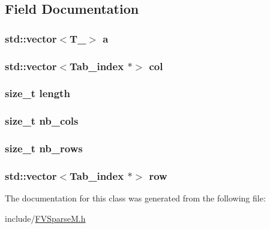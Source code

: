\subsection{Field Documentation}
\hypertarget{classFVSparseM_aba6347ed10b77e06dd559a865724cfa6}{
\subsubsection[{a}]{\setlength{\rightskip}{0pt plus 5cm}std::vector$<$T\_\-$>$ {\bf a}}}
\label{d2/d4d/classFVSparseM_aba6347ed10b77e06dd559a865724cfa6}
\hypertarget{classFVSparseM_a075a80b2189de3b24e0c89b98cf4ddb9}{
\subsubsection[{col}]{\setlength{\rightskip}{0pt plus 5cm}std::vector$<${\bf Tab\_\-index} $\ast$$>$ {\bf col}}}
\label{d2/d4d/classFVSparseM_a075a80b2189de3b24e0c89b98cf4ddb9}
\hypertarget{classFVSparseM_ae809d5359ac030c60a30a8f0b2294b82}{
\subsubsection[{length}]{\setlength{\rightskip}{0pt plus 5cm}size\_\-t {\bf length}}}
\label{d2/d4d/classFVSparseM_ae809d5359ac030c60a30a8f0b2294b82}
\hypertarget{classFVSparseM_a4451904bc3a87b7e94ba9967cfe5acc9}{
\subsubsection[{nb\_\-cols}]{\setlength{\rightskip}{0pt plus 5cm}size\_\-t {\bf nb\_\-cols}}}
\label{d2/d4d/classFVSparseM_a4451904bc3a87b7e94ba9967cfe5acc9}
\hypertarget{classFVSparseM_a660778a5412448cf6b641e67d1d70011}{
\subsubsection[{nb\_\-rows}]{\setlength{\rightskip}{0pt plus 5cm}size\_\-t {\bf nb\_\-rows}}}
\label{d2/d4d/classFVSparseM_a660778a5412448cf6b641e67d1d70011}
\hypertarget{classFVSparseM_ad5e348a06667f83ce7654e382e90ce57}{
\subsubsection[{row}]{\setlength{\rightskip}{0pt plus 5cm}std::vector$<${\bf Tab\_\-index} $\ast$$>$ {\bf row}}}
\label{d2/d4d/classFVSparseM_ad5e348a06667f83ce7654e382e90ce57}


The documentation for this class was generated from the following file:\begin{DoxyCompactItemize}
\item 
include/\hyperlink{FVSparseM_8h}{FVSparseM.h}\end{DoxyCompactItemize}
